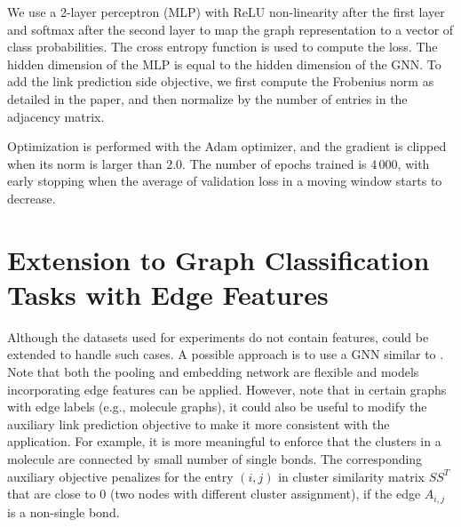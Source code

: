 We use a 2-layer perceptron (MLP) with ReLU non-linearity after the first layer and softmax after the second layer to map the graph representation to a vector of class probabilities. The cross entropy function is used to compute the loss. The hidden dimension of the MLP is equal to the hidden dimension of the GNN. 
To add the link prediction side objective, we first compute the Frobenius norm as detailed in the paper, and then normalize by the number of entries in the adjacency matrix.

Optimization is performed with the Adam optimizer, and the gradient is clipped when its norm is larger than $2.0$. The number of epochs trained is 4\,000, with early stopping when the average of validation loss in a moving window starts to decrease. 

\section{Extension to Graph Classification Tasks with Edge Features}

Although the datasets used for experiments do not contain features, \name could be extended to handle such cases.
A possible approach is to use a GNN similar to \cite{kipf2018neural}. Note that both the pooling and embedding network are flexible and models incorporating edge features can be applied.
However, note that in certain graphs with edge labels (e.g., molecule graphs), it could also be useful to modify the auxiliary link prediction objective to make it more consistent with the application.
For example, it is more meaningful to enforce that the clusters in a molecule are connected by small number of single bonds.
The corresponding auxiliary objective penalizes for the entry $(i,j)$ in cluster similarity matrix $S S^T$ that are close to $0$ (two nodes with different cluster assignment), if the edge $A_{i,j}$ is a non-single bond.
